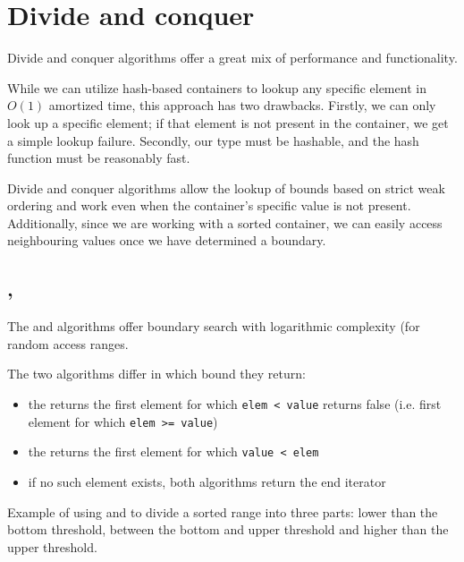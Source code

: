\section{Divide and conquer}

Divide and conquer algorithms offer a great mix of performance and functionality.

While we can utilize hash-based containers to lookup any specific element in $O(1)$ amortized time, this approach has two drawbacks. Firstly, we can only look up a specific element; if that element is not present in the container, we get a simple lookup failure. Secondly, our type must be hashable, and the hash function must be reasonably fast.

Divide and conquer algorithms allow the lookup of bounds based on strict weak ordering and work even when the container’s specific value is not present. Additionally, since we are working with a sorted container, we can easily access neighbouring values once we have determined a boundary.

\subsection{\texorpdfstring{, }{\texttt{std::lower\_bound}, \texttt{std::upper\_bound}}}

The  and  algorithms offer boundary search with logarithmic complexity (for random access ranges.


\noindent The two algorithms differ in which bound they return:

\begin{itemize}
    \item the  returns the first element for which \texttt{elem < value} returns false (i.e. first element for which \texttt{elem >= value})
    \item the  returns the first element for which \texttt{value < elem}
    \item if no such element exists, both algorithms return the end iterator
\end{itemize}

\begin{box-note}
\footnotesize Example of using  and  to divide a sorted range into three parts: lower than the bottom threshold, between the bottom and upper threshold and higher than the upper threshold.
\tcblower
{}
\end{box-note}


